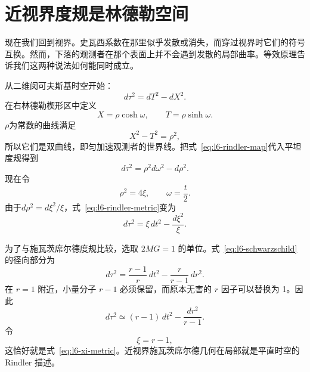 \section{近视界度规是林德勒空间}

现在我们回到视界。史瓦西系数在那里似乎发散或消失，而穿过视界时它们的符号互换。然而，下落的观测者在那个表面上并不会遇到发散的局部曲率。等效原理告诉我们这两种说法如何能同时成立。

从二维闵可夫斯基时空开始：
\begin{equation}
d\tau^{2}=dT^{2}-dX^{2}.
\end{equation}
在右林德勒楔形区中定义
\begin{equation}
X=\rho\cosh\omega,
\qquad
T=\rho\sinh\omega.
\label{eq:l6-rindler-map}
\end{equation}
\(\rho\)为常数的曲线满足
\begin{equation}
X^{2}-T^{2}=\rho^{2},
\end{equation}
所以它们是双曲线，即匀加速观测者的世界线。把式~\eqref{eq:l6-rindler-map}代入平坦度规得到
\begin{equation}
d\tau^{2}
=\rho^{2}d\omega^{2}-d\rho^{2}.
\label{eq:l6-rindler-metric}
\end{equation}
现在令
\begin{equation}
\rho^{2}=4\xi,
\qquad
\omega=\frac{t}{2}.
\label{eq:l6-rindler-rescale}
\end{equation}
由于\(d\rho^{2}=d\xi^{2}/\xi\)，式~\eqref{eq:l6-rindler-metric}变为
\begin{equation}
d\tau^{2}
=\xi\,dt^{2}-\frac{d\xi^{2}}{\xi}.
\label{eq:l6-xi-metric}
\end{equation}

\begin{classroomqa}
\end{classroomqa}

为了与施瓦茨席尔德度规比较，选取 \(2MG=1\) 的单位。式~\eqref{eq:l6-schwarzschild}的径向部分为
\begin{equation}
d\tau^{2}
=
\frac{r-1}{r}\,dt^{2}
-
\frac{r}{r-1}\,dr^{2}.
\end{equation}
在 \(r=1\) 附近，小量分子 \(r-1\) 必须保留，而原本无害的 \(r\) 因子可以替换为 1。因此
\begin{equation}
d\tau^{2}
\simeq
(r-1)\,dt^{2}
-
\frac{dr^{2}}{r-1}.
\end{equation}
令
\begin{equation}
\xi=r-1,
\end{equation}
这恰好就是式~\eqref{eq:l6-xi-metric}。近视界施瓦茨席尔德几何在局部就是平直时空的 Rindler 描述。

